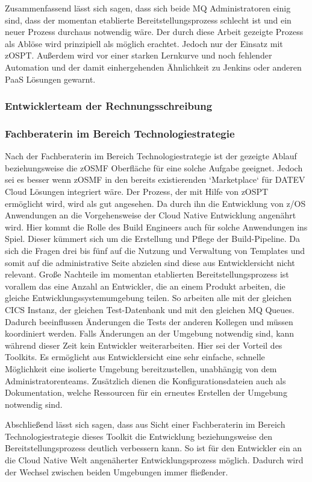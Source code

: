 Zusammenfassend lässt sich sagen, dass sich beide MQ Administratoren einig sind, dass der momentan etablierte Bereitstellungsprozess schlecht ist und ein neuer Prozess durchaus notwendig wäre.
Der durch diese Arbeit gezeigte Prozess als Ablöse wird prinzipiell als möglich erachtet.
Jedoch nur der Einsatz mit zOSPT.
Außerdem wird vor einer starken Lernkurve und noch fehlender Automation und der damit einhergehenden Ähnlichkeit zu Jenkins oder anderen PaaS Lösungen gewarnt.

\subsubsection{Entwicklerteam der Rechnungsschreibung}

\subsubsection{Fachberaterin im Bereich Technologiestrategie}
Nach der Fachberaterin im Bereich Technologiestrategie ist der gezeigte Ablauf beziehungsweise die zOSMF Oberfläche für eine solche Aufgabe geeignet.
Jedoch sei es besser wenn zOSMF in den bereits existierenden `Marketplace` für DATEV Cloud Lösungen integriert wäre.
Der Prozess, der mit Hilfe von zOSPT ermöglicht wird, wird als gut angesehen.
Da durch ihn die Entwicklung von z/OS Anwendungen an die Vorgehensweise der Cloud Native Entwicklung angenährt wird.
Hier kommt die Rolle des Build Engineers auch für solche Anwendungen ins Spiel.
Dieser kümmert sich um die Erstellung und Pflege der Build-Pipeline.
Da sich die Fragen drei bis fünf auf die Nutzung und Verwaltung von Templates und somit auf die administrative Seite abzielen sind diese aus Entwicklersicht nicht relevant.
Große Nachteile im momentan etablierten Bereitstellungsprozess ist vorallem das eine Anzahl an Entwickler, die an einem Produkt arbeiten, die gleiche Entwicklungssystemumgebung teilen.
So arbeiten alle mit der gleichen CICS Instanz, der gleichen Test-Datenbank und mit den gleichen MQ Queues.
Dadurch beeinflussen Änderungen die Tests der anderen Kollegen und müssen koordiniert werden.
Falls Änderungen an der Umgebung notwendig sind, kann während dieser Zeit kein Entwickler weiterarbeiten.
Hier sei der Vorteil des Toolkits.
Es ermöglicht aus Entwicklersicht eine sehr einfache, schnelle Möglichkeit eine isolierte Umgebung bereitzustellen, unabhängig von dem Administratorenteams.
Zusätzlich dienen die Konfigurationsdateien auch als Dokumentation, welche Ressourcen für ein erneutes Erstellen der Umgebung notwendig sind.

Abschließend lässt sich sagen, dass aus Sicht einer Fachberaterin im Bereich Technologiestrategie dieses Toolkit die Entwicklung beziehungsweise den Bereitstellungsprozess deutlich verbessern kann.
So ist für den Entwickler ein an die Cloud Native Welt angenäherter Entwicklungsprozess möglich.
Dadurch wird der Wechsel zwischen beiden Umgebungen immer fließender.